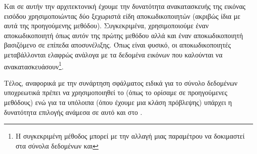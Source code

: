 Και σε αυτήν την αρχιτεκτονική έχουμε την δυνατότητα ανακατασκευής της εικόνας εισόδου χρησιμοποιώντας δύο ξεχωριστά είδη αποκωδικοποιητών (ακριβώς ίδια με αυτά της προηγούμενης μεθόδου). Συγκεκριμένα, χρησιμοποιούμε έναν αποκωδικοποιητή όπως αυτόν της πρώτης μεθόδου αλλά και έναν αποκωδικοποιητή βασιζόμενο σε επίπεδα αποσυνέλιξης. Όπως είναι φυσικό, οι αποκωδικοποιητές μεταβάλλονται ελαφρώς ανάλογα με τα δεδομένα εικόνων που καλούνται να ανακατασκευάσουν\footnote{Η συγκεκριμένη μέθοδος μπορεί με την αλλαγή μιας παραμέτρου να δοκιμαστεί στα σύνολα δεδομένων  και }.\par

Τέλος, αναφορικά με την συνάρτηση σφάλματος ειδικά για το σύνολο δεδομένων υποχρεωτικά πρέπει να χρησιμοποιηθεί  το (όπως το ορίσαμε σε προηγούμενες μεθόδους) ενώ για τα υπόλοιπα (όπου έχουμε μια κλάση πρόβλεψης) υπάρχει η δυνατότητα επιλογής ανάμεσα σε αυτό και στο .\par
